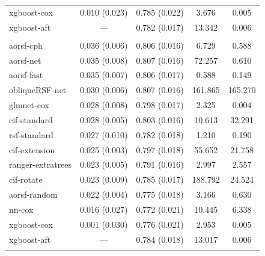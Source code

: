 \documentclass{article}\usepackage[]{graphicx}\usepackage[]{xcolor}
\newenvironment{knitrout}{}{} %
\begin{document}
\begin{knitrout}
\begin{longtable}[t]{lcccc}
\hspace{1em}xgboost-cox & 0.010 (0.023) & 0.785 (0.022) & 3.676 & 0.005\\
\hspace{1em}xgboost-aft & --- & 0.782 (0.017) & 13.342 & 0.006\\
\addlinespace[0.3em]
\multicolumn{5}{l}{\textit{\textbf{JHS; stroke, n = 3639, p = 80}}}\\
\hline
\hspace{1em}aorsf-cph & 0.036 (0.006) & 0.806 (0.016) & 6.729 & 0.588\\
\hspace{1em}aorsf-net & 0.035 (0.008) & 0.807 (0.016) & 72.257 & 0.610\\
\hspace{1em}aorsf-fast & 0.035 (0.007) & 0.806 (0.017) & 0.588 & 0.149\\
\hspace{1em}obliqueRSF-net & 0.030 (0.006) & 0.807 (0.016) & 161.865 & 165.270\\
\hspace{1em}glmnet-cox & 0.028 (0.008) & 0.798 (0.017) & 2.325 & 0.004\\
\hspace{1em}cif-standard & 0.028 (0.005) & 0.803 (0.016) & 10.613 & 32.291\\
\hspace{1em}rsf-standard & 0.027 (0.010) & 0.782 (0.018) & 1.210 & 0.190\\
\hspace{1em}cif-extension & 0.025 (0.003) & 0.797 (0.018) & 55.652 & 21.758\\
\hspace{1em}ranger-extratrees & 0.023 (0.005) & 0.791 (0.016) & 2.997 & 2.557\\
\hspace{1em}cif-rotate & 0.023 (0.009) & 0.785 (0.017) & 188.792 & 24.524\\
\hspace{1em}aorsf-random & 0.022 (0.004) & 0.775 (0.018) & 3.166 & 0.630\\
\hspace{1em}nn-cox & 0.016 (0.027) & 0.772 (0.021) & 10.445 & 6.338\\
\hspace{1em}xgboost-cox & 0.001 (0.030) & 0.776 (0.021) & 2.953 & 0.005\\
\hspace{1em}xgboost-aft & --- & 0.784 (0.018) & 13.017 & 0.006\\
\addlinespace[0.3em]

\end{longtable}
\end{knitrout}
\end{document}
